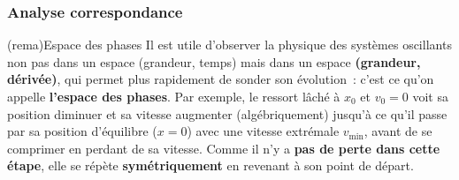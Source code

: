 \documentclass[../../main/main.tex]{subfiles}
\begin{document}
\subsubsection{Analyse correspondance}
\begin{tcb}[width=\linewidth, sidebyside, righthand ratio=.4](rema){Espace des
			phases}
	Il est utile d'observer la physique des systèmes oscillants non pas dans
	un espace (grandeur, temps) mais dans un espace \textbf{(grandeur,
		dérivée)}, qui permet plus rapidement de sonder son évolution~: c'est ce
	qu'on appelle \textbf{l'espace des phases}.
	\bigbreak
	Par
	exemple, le ressort lâché à $x_0$ et $v_0=0$ voit sa position diminuer
	et sa vitesse augmenter (algébriquement) jusqu'à ce qu'il passe par sa
	position d'équilibre ($x=0$) avec une vitesse extrémale $v_{\min}$,
	avant de se comprimer en perdant de sa vitesse.
	\bigbreak
	Comme il n'y a
	\textbf{pas de perte dans cette étape}, elle se répète
	\textbf{symétriquement} en revenant à son point de départ.
	\tcblower
	\begin{center}
\end{center}
\end{tcb}
\end{document}
